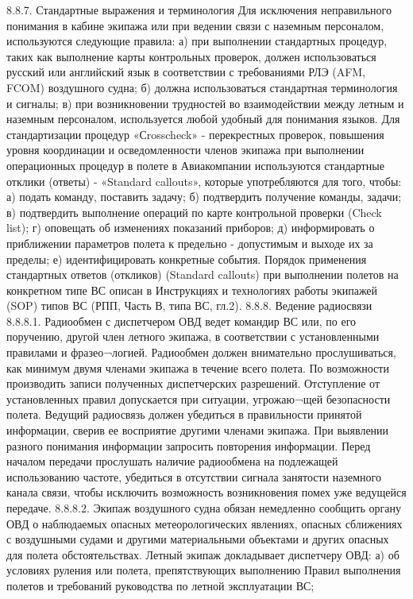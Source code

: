 8.8.7. Стандартные выражения и терминология
Для исключения неправильного понимания в кабине экипажа или при ведении связи с наземным персоналом, используются следующие правила:
а)	при выполнении стандартных процедур, таких как выполнение карты контрольных проверок, должен использоваться русский или английский язык в соответствии с требованиями РЛЭ (AFM, FCOM) воздушного судна;
б)	должна использоваться стандартная терминология и сигналы;
в)	при возникновении трудностей во взаимодействии между летным и наземным персоналом, используется любой удобный для понимания языков.
Для стандартизации процедур «Сrosscheck» - перекрестных проверок, повышения уровня координации и осведомленности членов экипажа при выполнении операционных процедур в полете в Авиакомпании используются стандартные отклики (ответы) - «Standard callouts», которые употребляются для того, чтобы:
а)	подать команду, поставить задачу;
б)	подтвердить получение команды, задачи;
в)	подтвердить выполнение операций по карте контрольной проверки (Check list);
г)	оповещать об изменениях показаний приборов;
д)	информировать о приближении параметров полета к предельно - допустимым и выходе их за пределы;
е)	идентифицировать конкретные события.
Порядок применения стандартных ответов (откликов) (Standard callouts) при выполнении полетов на конкретном типе ВС описан в Инструкциях и технологиях работы экипажей (SOP) типов ВС (РПП, Часть В, типа ВС, гл.2).
8.8.8. Ведение радиосвязи
8.8.8.1. Радиообмен с диспетчером ОВД ведет командир ВС или, по его поручению, другой член летного экипажа, в соответствии с установленными правилами и фразео¬логией. Радиообмен должен внимательно прослушиваться, как минимум двумя членами экипажа в течение всего полета. По возможности производить записи полученных диспетчерских разрешений.
Отступление от установленных правил допускается при ситуации, угрожаю¬щей безопасности полета. Ведущий радиосвязь должен убедиться в правильности принятой информации, сверив ее восприятие другими членами экипажа. При выявлении разного понимания информации запросить повторения информации.
Перед началом передачи прослушать наличие радиообмена на подлежащей использованию частоте, убедиться в отсутствии сигнала занятости наземного канала связи, чтобы исключить возможность возникновения помех уже ведущейся передаче.
8.8.8.2. Экипаж воздушного судна обязан немедленно сообщить органу ОВД о наблюдаемых опасных метеорологических явлениях, опасных сближениях с воздушными судами и другими материальными объектами и других опасных для полета обстоятельствах.
Летный экипаж докладывает диспетчеру ОВД:
а)	об условиях руления или полета, препятствующих выполнению Правил выполнения полетов и требований руководства по летной эксплуатации ВС;

